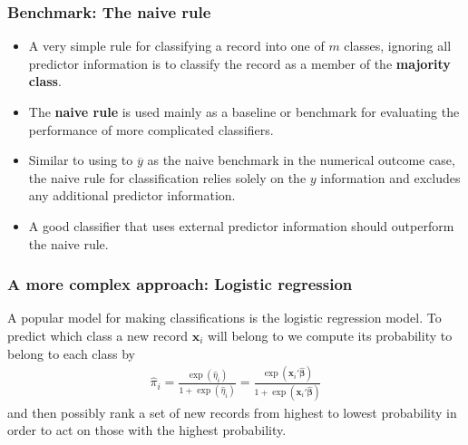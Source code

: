 \documentclass{beamer}
\newcommand{\ve}[1]{\mbox{$\boldsymbol{#1}$}}
\begin{document}
\begin{frame}
\frametitle{Benchmark: The naive rule}
\begin{itemize}
  \item A very simple rule for classifying a record into one of $m$ classes, ignoring all predictor
information is to classify the record
as a member of the \textbf{majority class}.
\vspace{0.2cm}
\item The \textbf{naive rule} is used mainly as a baseline or benchmark
for evaluating the performance of more complicated classifiers.
\vspace{0.2cm}
\item Similar to using to $\overline{y}$ as the naive benchmark in the numerical
outcome case, the naive rule for classification relies solely on the $y$ information
and excludes any additional predictor information.
\vspace{0.2cm}
\item A good classifier
that uses external predictor information should outperform the naive rule.
\end{itemize}
\end{frame}

\begin{frame}
\frametitle{A more complex approach: Logistic regression}
A popular model for making classifications is the logistic regression
model. To predict which class a
new record $\textbf{x}_i$ will belong to we compute its probability to belong to each class by
\begin{align}\nonumber
\hat{\pi}_i=\frac{\exp{(\hat{\eta}_i)}}{1 + \exp{(\hat{\eta}_i)}}=\frac{\exp{(\ve{x}_i' \ve{\hat{\beta}})}}{1 + \exp{(\ve{x}_i' \ve{\hat{\beta}})}}
\end{align}
and then
possibly rank a set of new records from highest to lowest probability in order to
act on those with the highest probability.
\end{frame}
\end{document}
